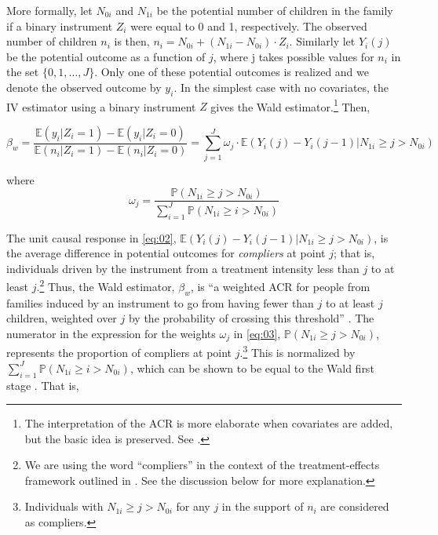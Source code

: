 
More formally, let $ N_{0i} $ and $ N_{1i} $ be the potential number of children in the family if a binary instrument $ Z_{i} $ were equal to 0 and 1, respectively. The observed number of children $ n_{i} $ is then, $ n_{i} = N_{0i} + (N_{1i} - N_{0i})\cdot Z_{i} $. Similarly let $ Y_{i}(j) $ be the potential outcome as a function of $ j $, where j takes possible values for $ n_{i} $ in the set $ \{0, 1, \dots, J\} $. Only one of these potential outcomes is realized and we denote the observed outcome by $ y_{i} $. In the simplest case with no covariates, the IV estimator using a binary instrument $ Z $ gives the Wald estimator.\footnote{The interpretation of the ACR is more elaborate when covariates are added, but the basic idea is preserved. See \textcite[p.~437]{Angrist1995}.} Then,


\begin{equation}\label{eq:02}
	\beta_{w} = \dfrac{\mathbb{E}(y_{i} | Z_{i} = 1) - \mathbb{E}(y_{i} | Z_{i} = 0)}{\mathbb{E}(n_{i} | Z_{i} = 1) - \mathbb{E}(n_{i} | Z_{i} = 0)} = \sum_{j = 1}^{J} \omega_{j}\cdot \mathbb{E}(Y_{i}(j) - Y_{i}(j-1) | N_{1i} \geq j > N_{0i})
\end{equation}

where
\begin{equation}\label{eq:03}
\omega_{j} = \dfrac{\mathbb{P}(N_{1i} \geq j > N_{0i})}{\sum_{i = 1}^{J} \mathbb{P}(N_{1i} \geq i > N_{0i})}
\end{equation}
\vskip10pt

The unit causal response in \eqref{eq:02}, $ \mathbb{E}(Y_{i}(j) - Y_{i}(j-1) | N_{1i} \geq j > N_{0i}) $, is the average difference in potential outcomes for \textit{compliers} at point $ j $; that is, individuals driven by the instrument from a treatment intensity less than $ j $ to at least $ j $.\footnote{We are using the word \enquote{compliers} in the context of the treatment-effects framework outlined in \textcite{angrist_identification_1996}. See the discussion below for more explanation.} Thus, the Wald estimator, $ \beta_{w} $, is \enquote{a weighted ACR for people from families induced by an instrument to go from having fewer than $ j $ to at least $ j $ children, weighted over $ j $ by the probability of crossing this threshold} \parencite[p.~787]{angrist_multiple_2010}. The numerator in the expression for the weights $ \omega_{j} $ in \eqref{eq:03}, $ \mathbb{P}(N_{1i} \geq j > N_{0i}) $, represents the proportion of compliers at point $ j $.\footnote{Individuals with $ N_{1i} \geq j > N_{0i} $  for any $ j $ in the support of $ n_{i} $ are considered as compliers.} This is normalized by $ \sum_{i = 1}^{J} \mathbb{P}(N_{1i} \geq i > N_{0i}) $, which can be shown to be equal to the Wald first stage \parencite[see][p.~183]{Angrist2009}. That is,

